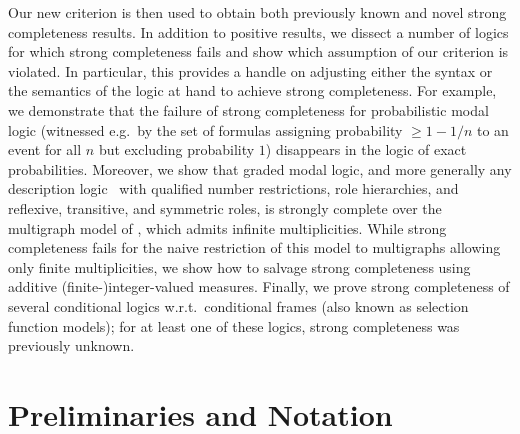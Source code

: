 \documentclass[proceedings]{stacs}
\theoremstyle{definition}
\theoremstyle{plain}
\DeclareMathOperator{\mge}{\ge}
\begin{document}
Our new criterion is then used to obtain both previously known and
novel strong completeness results. In addition to positive results, we
dissect a number of logics for which strong completeness fails and
show which assumption of our criterion is violated. In particular,
this provides a handle on adjusting either the syntax or the semantics
of the logic at hand to achieve strong completeness.
For example, we demonstrate that the failure of strong
completeness for probabilistic modal logic (witnessed e.g.\ by the set
of formulas assigning probability $\mge 1-1/n$ to an event for all $n$
but excluding probability $1$) disappears in the logic of exact
probabilities.  Moreover, we show that graded modal logic, and more
generally any description logic~\cite{BaaderEA03} with qualified
number restrictions, role hierarchies, and reflexive, transitive, and
symmetric roles, is strongly complete over the multigraph model of
\cite{DAgostinoVisser02}, which admits infinite multiplicities. While
strong completeness fails for the naive restriction of this model to
multigraphs allowing only finite multiplicities, we show how to
salvage strong completeness using additive
\mbox{(finite-)integer}-valued measures. Finally, we prove strong
completeness of several conditional logics w.r.t.\ conditional frames
(also known as selection function models); for at least one of these
logics, strong completeness was previously unknown.




\section{Preliminaries and Notation}
\end{document}
